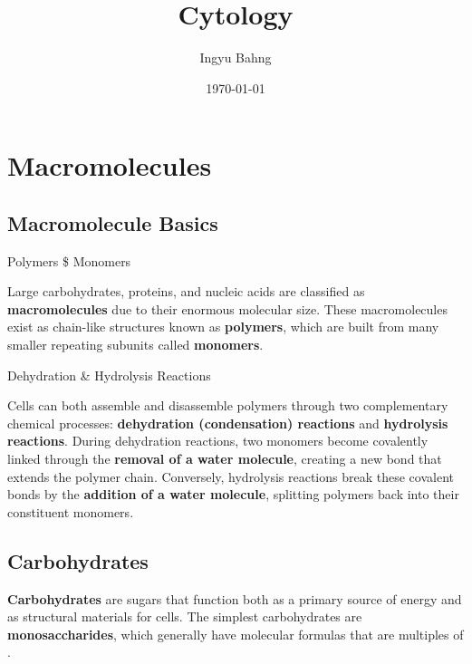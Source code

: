 \documentclass[10pt]{article}
\title{Cytology}
\date{\today}
\author{Ingyu Bahng}
\begin{document}


\section{Macromolecules}

  \subsection{Macromolecule Basics}

    \begin{core}{Polymers \$ Monomers}

      Large carbohydrates, proteins, and nucleic acids are classified as \textbf{macromolecules} due to their enormous molecular size. These macromolecules exist as chain-like structures known as \textbf{polymers}, which are built from many smaller repeating subunits called \textbf{monomers}.

    \end{core}

    \begin{core}{Dehydration \& Hydrolysis Reactions}

      Cells can both assemble and disassemble polymers through two complementary chemical processes: \textbf{dehydration (condensation) reactions} and \textbf{hydrolysis reactions}. During dehydration reactions, two monomers become covalently linked through the \textbf{removal of a water molecule}, creating a new bond that extends the polymer chain. Conversely, hydrolysis reactions break these covalent bonds by the \textbf{addition of a water molecule}, splitting polymers back into their constituent monomers.



    \end{core}

  \subsection{Carbohydrates}

    \textbf{Carbohydrates} are sugars that function both as a primary source of energy and as structural materials for cells. The simplest carbohydrates are \textbf{monosaccharides}, which generally have molecular formulas that are multiples of . 
\end{document}
